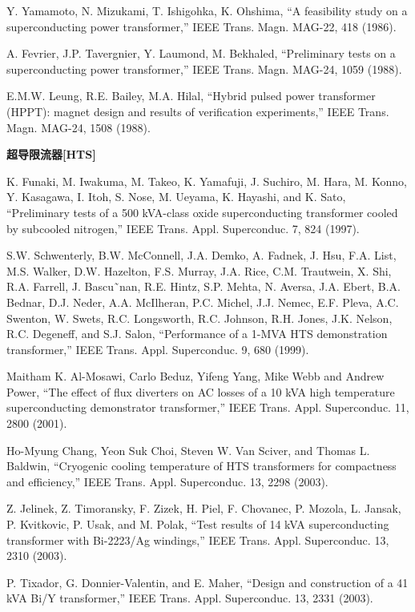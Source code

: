 \noindent [9.154] Y. Yamamoto, N. Mizukami, T. Ishigohka, K. Ohshima, ``A feasibility study on a
superconducting power transformer,” IEEE Trans. Magn. MAG-22, 418 (1986).

\noindent [9.155] A. Fevrier, J.P. Tavergnier, Y. Laumond, M. Bekhaled, ``Preliminary tests on a
superconducting power transformer,” IEEE Trans. Magn. MAG-24, 1059 (1988).

\noindent [9.156] E.M.W. Leung, R.E. Bailey, M.A. Hilal, ``Hybrid pulsed power transformer
(HPPT): magnet design and results of verification experiments,” IEEE Trans.
Magn. MAG-24, 1508 (1988).

\noindent \textbf{超导限流器[HTS] }

\noindent [9.157] K. Funaki, M. Iwakuma, M. Takeo, K. Yamafuji, J. Suchiro, M. Hara, M. Konno,
Y. Kasagawa, I. Itoh, S. Nose, M. Ueyama, K. Hayashi, and K. Sato, ``Preliminary
tests of a 500 kVA-class oxide superconducting transformer cooled by subcooled
nitrogen,” IEEE Trans. Appl. Superconduc. 7, 824 (1997).

\noindent [9.158] S.W. Schwenterly, B.W. McConnell, J.A. Demko, A. Fadnek, J. Hsu, F.A. List,
M.S. Walker, D.W. Hazelton, F.S. Murray, J.A. Rice, C.M. Trautwein, X. Shi,
R.A. Farrell, J. Bascu˜nan, R.E. Hintz, S.P. Mehta, N. Aversa, J.A. Ebert, B.A.
Bednar, D.J. Neder, A.A. McIlheran, P.C. Michel, J.J. Nemec, E.F. Pleva, A.C.
Swenton, W. Swets, R.C. Longsworth, R.C. Johnson, R.H. Jones, J.K. Nelson,
R.C. Degeneff, and S.J. Salon, ``Performance of a 1-MVA HTS demonstration
transformer,” IEEE Trans. Appl. Superconduc. 9, 680 (1999).

\noindent [9.159] Maitham K. Al-Mosawi, Carlo Beduz, Yifeng Yang, Mike Webb and Andrew Power, ``The effect of flux diverters on AC losses of a 10 kVA high temperature
superconducting demonstrator transformer,” IEEE Trans. Appl. Superconduc.
11, 2800 (2001).

\noindent [9.160] Ho-Myung Chang, Yeon Suk Choi, Steven W. Van Sciver, and Thomas L. Baldwin,
``Cryogenic cooling temperature of HTS transformers for compactness and
efficiency,” IEEE Trans. Appl. Superconduc. 13, 2298 (2003).

\noindent [9.161] Z. Jelinek, Z. Timoransky, F. Zizek, H. Piel, F. Chovanec, P. Mozola, L. Jansak,
P. Kvitkovic, P. Usak, and M. Polak, ``Test results of 14 kVA superconducting
transformer with Bi-2223/Ag windings,” IEEE Trans. Appl. Superconduc. 13,
2310 (2003).

\noindent [9.162] P. Tixador, G. Donnier-Valentin, and E. Maher, ``Design and construction of a
41 kVA Bi/Y transformer,” IEEE Trans. Appl. Superconduc. 13, 2331 (2003).

